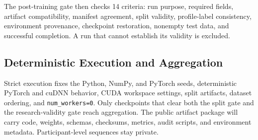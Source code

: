 The post-training gate then checks 14 criteria: run purpose, required fields, artifact compatibility, manifest agreement, split validity, profile-label consistency, environment provenance, checkpoint restoration, nonempty test data, and successful completion. A run that cannot establish its validity is excluded.

\subsection{Deterministic Execution and Aggregation}

Strict execution fixes the Python, NumPy, and PyTorch seeds, deterministic PyTorch and cuDNN behavior, CUDA workspace settings, split artifacts, dataset ordering, and \texttt{num\_workers=0}. Only checkpoints that clear both the split gate and the research-validity gate reach aggregation. The public artifact package will carry code, weights, schemas, checksums, metrics, audit scripts, and environment metadata. Participant-level sequences stay private.